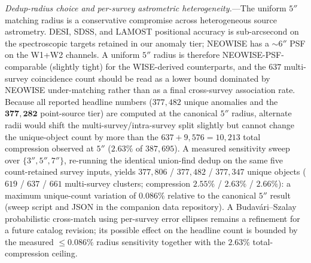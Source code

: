 \documentclass[aps,prd,twocolumn,superscriptaddress,showpacs,preprintnumbers,nofootinbib,longbibliography,floatfix]{revtex4-2}
\begin{document}
\textit{Dedup-radius choice and per-survey astrometric heterogeneity.}---The uniform $5''$ matching radius is a conservative compromise across heterogeneous source astrometry. DESI, SDSS, and LAMOST positional accuracy is sub-arcsecond on the spectroscopic targets retained in our anomaly tier; \mbox{NEOWISE} has a $\sim\!6''$ PSF on the W1+W2 channels. A uniform $5''$ radius is therefore \mbox{NEOWISE}-PSF-comparable (slightly tight) for the WISE-derived counterparts, and the $637$ multi-survey coincidence count should be read as a lower bound dominated by NEOWISE under-matching rather than as a final cross-survey association rate. Because all reported headline numbers ($377{,}482$ unique anomalies and the $\mathbf{377{,}282}$ point-source tier) are computed at the canonical $5''$ radius, alternate radii would shift the multi-survey/intra-survey split slightly but cannot change the unique-object count by more than the $637 + 9{,}576 = 10{,}213$ total compression observed at $5''$ ($2.63\%$ of $387{,}695$). A measured sensitivity sweep over $\{3'', 5'', 7''\}$, re-running the identical union-find dedup on the same five count-retained survey inputs, yields $377{,}806$ / $377{,}482$ / $377{,}347$ unique objects ($619$ / $637$ / $661$ multi-survey clusters; compression $2.55\%$ / $2.63\%$ / $2.66\%$): a maximum unique-count variation of $0.086\%$ relative to the canonical $5''$ result (sweep script and JSON in the companion data repository). A Budav\'ari--Szalay probabilistic cross-match using per-survey error ellipses remains a refinement for a future catalog revision; its possible effect on the headline count is bounded by the measured $\leq 0.086\%$ radius sensitivity together with the $2.63\%$ total-compression ceiling.
\end{document}
